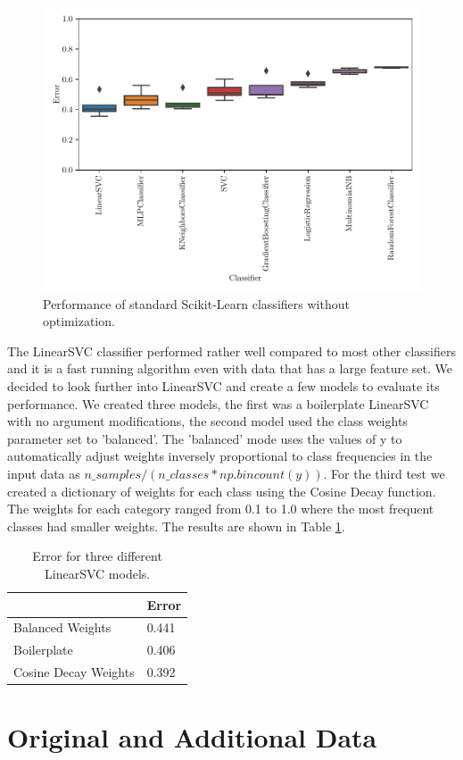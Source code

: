 \begin{figure}[ht]
  \centering
  \includegraphics[width=\textwidth]{../img/plot_explore_classifiers.pdf}
  \caption{Performance of standard Scikit-Learn classifiers without optimization.}
  \label{fig:explore_classifiers}
\end{figure}

The LinearSVC classifier performed rather well compared to most other classifiers and it is a fast running algorithm even with data that has a large feature set. We decided to look further into LinearSVC and create a few models to evaluate its performance. We created three models, the first was a boilerplate LinearSVC with no argument modifications, the second model used the class weights parameter set to 'balanced'. The 'balanced' mode uses the values of y to automatically adjust weights inversely proportional to class frequencies in the input data as $n\_samples / (n\_classes * np.bincount(y))$. For the third test we created a dictionary of weights for each class using the Cosine Decay function. The weights for each category ranged from 0.1 to 1.0 where the most frequent classes had smaller weights. The results are shown in Table \ref{tab:lsvc_models}.


\begin{table}[h]
\centering
\begin{tabular}{|l|l|}
\hline
{} & \textbf{Error} \\
\hline
Balanced Weights & 0.441 \\
\hline
Boilerplate & 0.406 \\
\hline
Cosine Decay Weights & 0.392 \\
\hline
\end{tabular}
\caption{Error for three different LinearSVC models.}
\label{tab:lsvc_models}
\end{table}


\section{Original and Additional Data}